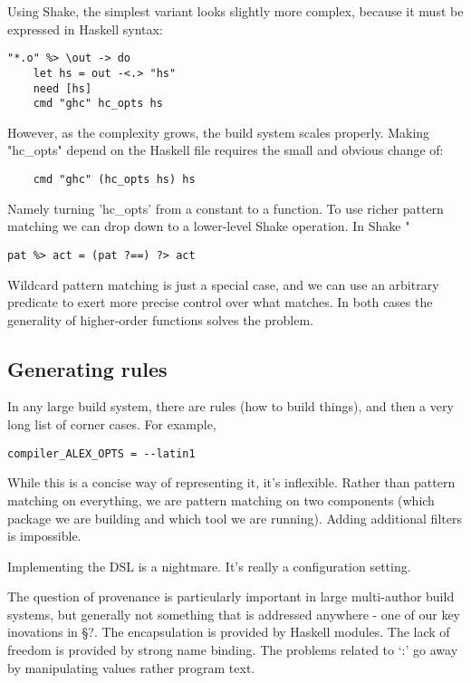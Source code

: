 \noindent Using Shake, the simplest variant looks slightly more complex, because
it must be expressed in Haskell syntax:

\begin{lstlisting}
"*.o" %> \out -> do
    let hs = out -<.> "hs"
    need [hs]
    cmd "ghc" hc_opts hs
\end{lstlisting}
\noindent
However, as the complexity grows, the build system scales properly. Making
\lst"hc_opts" depend on the Haskell file requires the small and obvious change of:

\begin{lstlisting}
    cmd "ghc" (hc_opts hs) hs
\end{lstlisting}

\noindent Namely turning \lst'hc_opts' from a constant to a function. To use richer pattern matching we can drop down to a lower-level Shake operation. In Shake \lst"%

\begin{lstlisting}
pat %> act = (pat ?==) ?> act
\end{lstlisting}
\noindent
Wildcard pattern matching is just a special case, and we can use an
arbitrary predicate to exert more precise control over what matches.
In both cases the generality of higher-order functions solves the problem.

\subsection{Generating rules}


In any large build system, there are rules (how to build things), and then a
very long list of corner cases. For example,

\begin{lstlisting}
compiler_ALEX_OPTS = --latin1
\end{lstlisting}

While this is a concise way of representing it, it's inflexible. Rather than
pattern matching on everything, we are pattern matching on two components (which
package we are building and which tool we are running). Adding additional
filters is impossible.

Implementing the DSL is a nightmare. It's really a configuration setting.

The question of provenance is particularly important in large multi-author build
systems, but generally not something that is addressed anywhere - one of our key
inovations in \S?. The encapsulation is provided by Haskell modules. The lack of
freedom is provided by strong name binding. The problems related to `:' go away
by manipulating values rather program text.


